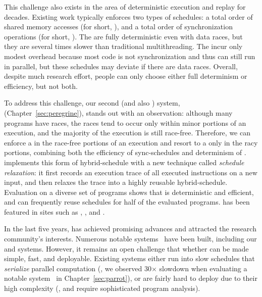  This challenge also exists in the area of deterministic
execution and replay for decades. Existing work typically enforces two types of
schedules: a total order of shared memory accesses (for short, \memsched), and a
total order of synchronization operations (for short, \syncsched). The
\memscheds are fully deterministic even with data races, but they are several
times slower than traditional multithreading. The \syncscheds incur only modest
overhead because most code is not synchronization and thus can still run in
parallel, but these schedules may deviate if there are data races. Overall,
despite much research effort, people can only choose either full determinism 
or efficiency, but not both.

To address this challenge, our second \smt (and also \dmt) system,
\peregrine (Chapter~\ref{sec:peregrine}), stands out
with an observation: although many programs have races, the races tend to occur
only within minor portions of an execution, and the majority of the execution is
still race-free. Therefore, we can enforce a \syncsched in the race-free
portions of an execution and resort to a \memsched only in the racy portions,
combining both the efficiency of sync-schedules and determinism of \memscheds. 
\peregrine implements this form of hybrid-schedule with a new technique called
\emph{schedule relaxation}: it first records an execution trace of
all executed instructions on a new input, and then relaxes the trace into a
highly reusable hybrid-schedule. Evaluation on a diverse set of programs shows
that \peregrine is deterministic and efficient, and can frequently reuse
schedules for half of the evaluated programs. \peregrine has been featured in
sites such as \acmtechnews, \tgdaily, and \physorg.

 In the last
five years, \smt has achieved promising advances and attracted the research
community's interests. Numerous notable \smt systems~\cite{determinator:osdi10,
cui:tern:osdi10, peregrine:sosp11, dthreads:sosp11, bergan:oopsla13} have been
built, including our \tern and \peregrine systems. However, it remains an open
challenge that whether \smt can be made simple, fast, and deployable. Existing 
\smt systems either run into slow schedules that \emph{serialize} parallel
computation (\eg, we observed 30$\times$ slowdown when evaluating a notable 
system~\cite{dthreads:sosp11} in Chapter~\ref{sec:parrot}), or are fairly hard 
to deploy due to their high complexity (\eg, \tern and \peregrine require 
sophisticated program analysis).


